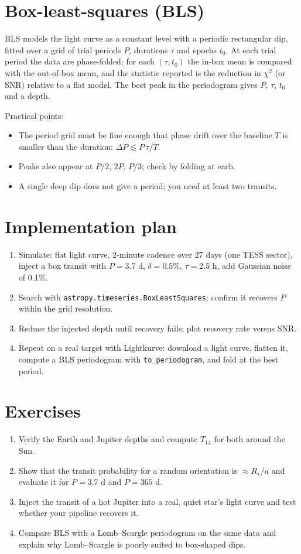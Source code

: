\section{Box-least-squares (BLS)}
BLS models the light curve as a constant level with a periodic rectangular dip, fitted over a grid of trial periods $P$, durations $\tau$ and epochs $t_0$. At each trial period the data are phase-folded; for each $(\tau,t_0)$ the in-box mean is compared with the out-of-box mean, and the statistic reported is the reduction in $\chi^2$ (or SNR) relative to a flat model. The best peak in the periodogram gives $P$, $\tau$, $t_0$ and a depth.

Practical points:
\begin{itemize}
\item The period grid must be fine enough that phase drift over the baseline $T$ is smaller than the duration: $\Delta P \lesssim P\,\tau/T$.
\item Peaks also appear at $P/2$, $2P$, $P/3$; check by folding at each.
\item A single deep dip does not give a period; you need at least two transits.
\end{itemize}

\section{Implementation plan}
\begin{enumerate}
\item Simulate: flat light curve, 2-minute cadence over 27 days (one TESS sector), inject a box transit with $P=3.7$ d, $\delta=0.5\%$, $\tau=2.5$ h, add Gaussian noise of 0.1\%.
\item Search with \texttt{astropy.timeseries.BoxLeastSquares}; confirm it recovers $P$ within the grid resolution.
\item Reduce the injected depth until recovery fails; plot recovery rate versus SNR.
\item Repeat on a real target with Lightkurve: download a light curve, flatten it, compute a BLS periodogram with \texttt{to\_periodogram}, and fold at the best period.
\end{enumerate}

\section{Exercises}
\begin{enumerate}
\item Verify the Earth and Jupiter depths and compute $T_{14}$ for both around the Sun.
\item Show that the transit probability for a random orientation is $\approx R_\star/a$ and evaluate it for $P=3.7$ d and $P=365$ d.
\item Inject the transit of a hot Jupiter into a real, quiet star's light curve and test whether your pipeline recovers it.
\item Compare BLS with a Lomb--Scargle periodogram on the same data and explain why Lomb--Scargle is poorly suited to box-shaped dips.
\end{enumerate}


